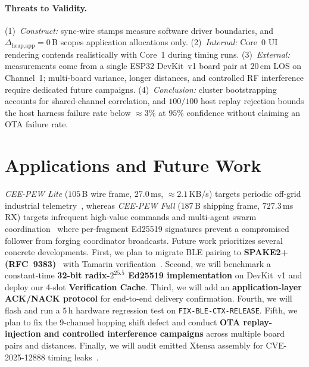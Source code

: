 \documentclass[conference]{IEEEtran}
\begin{document}
\paragraph{Threats to Validity.} (1)~\textit{Construct:} sync-wire stamps measure software driver boundaries, and $\Delta_{\text{heap,app}}=0$\,B scopes application allocations only. (2)~\textit{Internal:} Core~0 UI rendering contends realistically with Core~1 during timing runs. (3)~\textit{External:} measurements come from a single ESP32 DevKit~v1 board pair at $20$\,cm LOS on Channel~1; multi-board variance, longer distances, and controlled RF interference require dedicated future campaigns. (4)~\textit{Conclusion:} cluster bootstrapping accounts for shared-channel correlation, and $100/100$ host replay rejection bounds the host harness failure rate below $\approx 3\%$ at $95\%$ confidence without claiming an OTA failure rate.

\section{Applications and Future Work}\label{sec:future}\label{sec:swarm}
\textit{CEE-PEW Lite} ($105$\,B wire frame, $27.0$\,ms, $\approx 2.1$\,KB/s) targets periodic off-grid industrial telemetry~\cite{montiel2026,urazayev2023}, whereas \textit{CEE-PEW Full} ($187$\,B shipping frame, $727.3$\,ms RX) targets infrequent high-value commands and multi-agent swarm coordination~\cite{caniago2026} where per-fragment Ed25519 signatures prevent a compromised follower from forging coordinator broadcasts. Future work prioritizes several concrete developments. First, we plan to migrate BLE pairing to \textbf{SPAKE2+ (RFC~9383)}~\cite{rfc9383} with Tamarin verification~\cite{vanderlinden2023}. Second, we will benchmark a constant-time \textbf{32-bit radix-$2^{25.5}$ Ed25519 implementation} on DevKit~v1 and deploy our 4-slot \textbf{Verification Cache}. Third, we will add an \textbf{application-layer ACK/NACK protocol} for end-to-end delivery confirmation. Fourth, we will flash and run a $5$\,h hardware regression test on \texttt{FIX-BLE-CTX-RELEASE}. Fifth, we plan to fix the 9-channel hopping shift defect and conduct \textbf{OTA replay-injection and controlled interference campaigns} across multiple board pairs and distances. Finally, we will audit emitted Xtensa assembly for CVE-2025-12888 timing leaks~\cite{cve2025_12888}.
\end{document}
